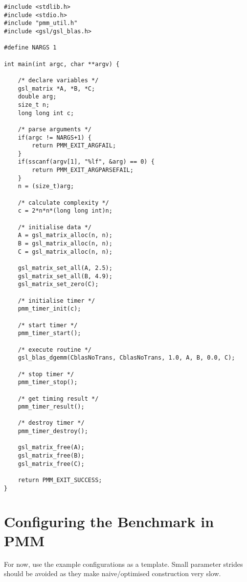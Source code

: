 \documentclass[a4paper,12pt]{report}
\begin{document}
    \begin{lstlisting}[style=c_code,caption=Square Matrix Multiplication Benchmark,label=square_mxm_code]
#include <stdlib.h>
#include <stdio.h>
#include "pmm_util.h"
#include <gsl/gsl_blas.h>

#define NARGS 1

int main(int argc, char **argv) {

	/* declare variables */
	gsl_matrix *A, *B, *C;
	double arg;
	size_t n;
	long long int c;

	/* parse arguments */
	if(argc != NARGS+1) {
		return PMM_EXIT_ARGFAIL;
	}
	if(sscanf(argv[1], "%lf", &arg) == 0) {
		return PMM_EXIT_ARGPARSEFAIL;
	}
	n = (size_t)arg;

	/* calculate complexity */
	c = 2*n*n*(long long int)n;

	/* initialise data */
	A = gsl_matrix_alloc(n, n);
	B = gsl_matrix_alloc(n, n);
	C = gsl_matrix_alloc(n, n);

	gsl_matrix_set_all(A, 2.5);
	gsl_matrix_set_all(B, 4.9);
	gsl_matrix_set_zero(C);

	/* initialise timer */
	pmm_timer_init(c);

	/* start timer */
	pmm_timer_start();

	/* execute routine */
	gsl_blas_dgemm(CblasNoTrans, CblasNoTrans, 1.0, A, B, 0.0, C);

	/* stop timer */
	pmm_timer_stop();

	/* get timing result */
	pmm_timer_result();

	/* destroy timer */
	pmm_timer_destroy();

	gsl_matrix_free(A);
	gsl_matrix_free(B);
	gsl_matrix_free(C);

	return PMM_EXIT_SUCCESS;
}
    \end{lstlisting}

    \section{Configuring the Benchmark in PMM}

    For now, use the example configurations as a template. Small parameter
    strides should be avoided as they make naive/optimised construction very
    slow.

    
\end{document}
